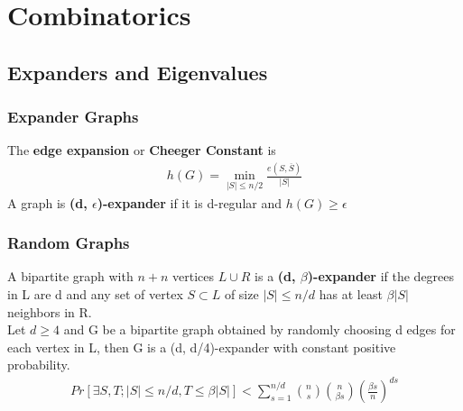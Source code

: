 \documentclass[12pt, letterpaper]{report}
\begin{document}
    \newpage
    \chapter{Combinatorics}
    \section{Expanders and Eigenvalues}
    \subsection{Expander Graphs}
    The \textbf{edge expansion} or \textbf{Cheeger Constant} is
    \begin{gather}
        h(G) = \min_{|S|\leq n/2} \frac{e(S,\overline{S})}{|S|}
    \end{gather}
    A graph is \textbf{(d, $\epsilon$)-expander} if it is d-regular and $h(G)\geq \epsilon$
    \subsection{Random Graphs}
    A bipartite graph with $n+n$ vertices $L \cup R$ is a \textbf{(d, $\beta$)-expander} if the degrees in L are d and any set of vertex 
    $S \subset L$ of size $|S|\leq n/d$ has at least $\beta |S|$ neighbors in R.\\
    Let $d\geq 4$ and G be a bipartite graph obtained by randomly choosing d edges for each vertex in L, then G is a (d, d/4)-expander with constant positive probability.\\
    \begin{gather*}
        Pr[\exists S, T;|S|\leq n/d, T\leq \beta |S|] < \sum_{s=1}^{n/d}{n \choose s}{n \choose \beta s}(\frac{\beta s}{n})^{ds}
    \end{gather*}
\end{document}
